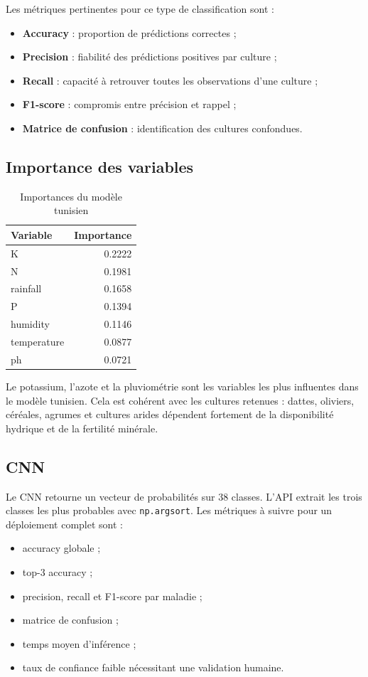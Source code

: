 \documentclass[12pt,a4paper]{report}
\begin{document}
Les métriques pertinentes pour ce type de classification sont :
\begin{itemize}[noitemsep]
  \item \textbf{Accuracy} : proportion de prédictions correctes ;
  \item \textbf{Precision} : fiabilité des prédictions positives par culture ;
  \item \textbf{Recall} : capacité à retrouver toutes les observations d'une culture ;
  \item \textbf{F1-score} : compromis entre précision et rappel ;
  \item \textbf{Matrice de confusion} : identification des cultures confondues.
\end{itemize}

\subsection{Importance des variables}
\begin{table}[H]
\centering
\caption{Importances du modèle tunisien}
\begin{tabular}{lr}
\toprule
\textbf{Variable} & \textbf{Importance} \\
\midrule
K & 0.2222 \\
N & 0.1981 \\
rainfall & 0.1658 \\
P & 0.1394 \\
humidity & 0.1146 \\
temperature & 0.0877 \\
ph & 0.0721 \\
\bottomrule
\end{tabular}
\end{table}

Le potassium, l'azote et la pluviométrie sont les variables les plus influentes dans le modèle tunisien. Cela est cohérent avec les cultures retenues : dattes, oliviers, céréales, agrumes et cultures arides dépendent fortement de la disponibilité hydrique et de la fertilité minérale.

\subsection{CNN}
Le CNN retourne un vecteur de probabilités sur 38 classes. L'API extrait les trois classes les plus probables avec \texttt{np.argsort}. Les métriques à suivre pour un déploiement complet sont :
\begin{itemize}[noitemsep]
  \item accuracy globale ;
  \item top-3 accuracy ;
  \item precision, recall et F1-score par maladie ;
  \item matrice de confusion ;
  \item temps moyen d'inférence ;
  \item taux de confiance faible nécessitant une validation humaine.
\end{itemize}
\end{document}
